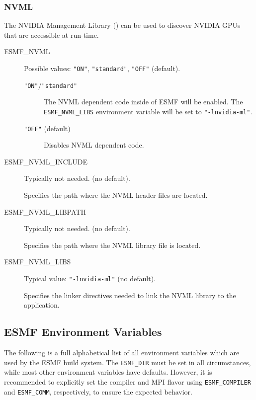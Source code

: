 \subsubsection{NVML}
\label{sec:NVML}

The NVIDIA Management Library
()
can be used to discover NVIDIA GPUs that are accessible at run-time.

\begin{description}

\item[ESMF\_NVML] Possible values: {\tt "ON"}, {\tt "standard"}, {\tt "OFF"} (default).

\begin{description}
\item[{\tt "ON"}/{\tt "standard"}] The NVML dependent code inside of ESMF will
be enabled.
The {\tt ESMF\_NVML\_LIBS} environment variable will be set to
{\tt "-lnvidia-ml"}.

\item[{\tt "OFF"} (default)] Disables NVML dependent code.
\end{description}

\item[ESMF\_NVML\_INCLUDE] Typically not needed. (no default).

Specifies the path where the NVML header files are located.

\item[ESMF\_NVML\_LIBPATH] Typically not needed. (no default).

Specifies the path where the NVML library file is located.

\item[ESMF\_NVML\_LIBS] Typical value: {\tt "-lnvidia-ml"} (no default).

Specifies the linker directives needed to link the NVML library to
the application.

\end{description}

\subsection{ESMF Environment Variables}
\label{EnvironmentVariables}

The following is a full alphabetical list of all environment variables which
are used by the ESMF build system. The {\tt ESMF\_DIR} must be set in all
circumstances, while most other environment variables have defaults. However,
it is recommended to explicitly set the compiler and MPI flavor using
{\tt ESMF\_COMPILER} and {\tt ESMF\_COMM}, respectively, to ensure the expected
behavior.

